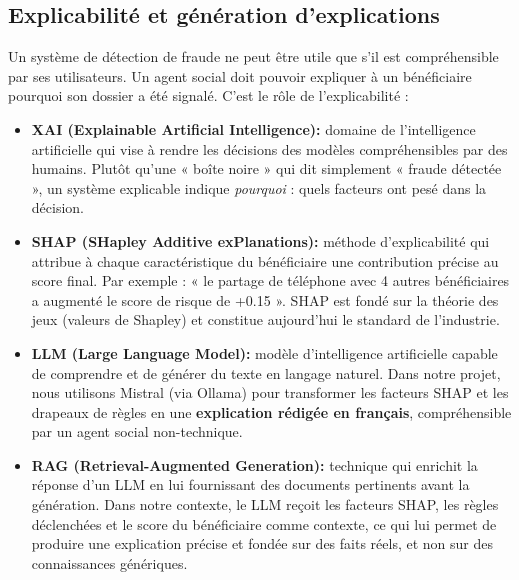 \documentclass[a4paper, oneside, 12pt]{book}
\begin{document}
\subsection{Explicabilité et génération d'explications}

\hspace{0.5cm}Un système de détection de fraude ne peut être utile que s'il est compréhensible par ses utilisateurs. Un agent social doit pouvoir expliquer à un bénéficiaire pourquoi son dossier a été signalé. C'est le rôle de l'explicabilité :

\begin{itemize}[label=\textbullet]

    \item \textbf{XAI (Explainable Artificial Intelligence):} domaine de l'intelligence artificielle qui vise à rendre les décisions des modèles compréhensibles par des humains. Plutôt qu'une « boîte noire » qui dit simplement « fraude détectée », un système explicable indique \textit{pourquoi} : quels facteurs ont pesé dans la décision.

    \item \textbf{SHAP (SHapley Additive exPlanations):} méthode d'explicabilité qui attribue à chaque caractéristique du bénéficiaire une contribution précise au score final. Par exemple : « le partage de téléphone avec 4 autres bénéficiaires a augmenté le score de risque de +0.15 ». SHAP est fondé sur la théorie des jeux (valeurs de Shapley) et constitue aujourd'hui le standard de l'industrie.

    \item \textbf{LLM (Large Language Model):} modèle d'intelligence artificielle capable de comprendre et de générer du texte en langage naturel. Dans notre projet, nous utilisons Mistral (via Ollama) pour transformer les facteurs SHAP et les drapeaux de règles en une \textbf{explication rédigée en français}, compréhensible par un agent social non-technique.

    \item \textbf{RAG (Retrieval-Augmented Generation):} technique qui enrichit la réponse d'un LLM en lui fournissant des documents pertinents avant la génération. Dans notre contexte, le LLM reçoit les facteurs SHAP, les règles déclenchées et le score du bénéficiaire comme contexte, ce qui lui permet de produire une explication précise et fondée sur des faits réels, et non sur des connaissances génériques.

\end{itemize}
\end{document}
